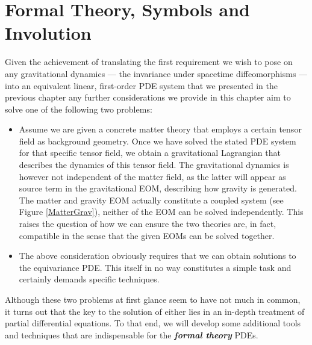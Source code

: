 \section{Formal Theory, Symbols and Involution}
Given the achievement of translating the first requirement we wish to pose on any gravitational dynamics --- the invariance under spacetime diffeomorphisms --- into an equivalent linear, first-order PDE system that we presented in the previous chapter any further considerations we provide in this chapter aim to solve one of the following two problems:
\begin{itemize}
    \item Assume we are given a concrete matter theory that employs a certain tensor field as background geometry. Once we have solved the stated PDE system for that specific tensor field, we obtain a gravitational Lagrangian that describes the dynamics of this tensor field. The gravitational dynamics is however not independent of the matter field, as the latter will appear as source term in the gravitational EOM, describing how gravity is generated.
    The matter and gravity EOM actually constitute a coupled system (see Figure \ref{MatterGrav}), neither of the EOM can be solved independently. This raises the question of how we can ensure the two theories are, in fact, compatible in the sense that the given EOMs can be solved together.
    \item The above consideration obviously requires that we can obtain solutions to the equivariance PDE. This itself in no way constitutes a simple task and certainly demands specific techniques.
\end{itemize}
Although these two problems at first glance seem to have not much in common, it turns out that the key to the solution of either lies in an in-depth treatment of partial differential equations. 
To that end, we will develop some additional tools and techniques that are indispensable for the  \textit{\textbf{formal theory}} PDEs.


